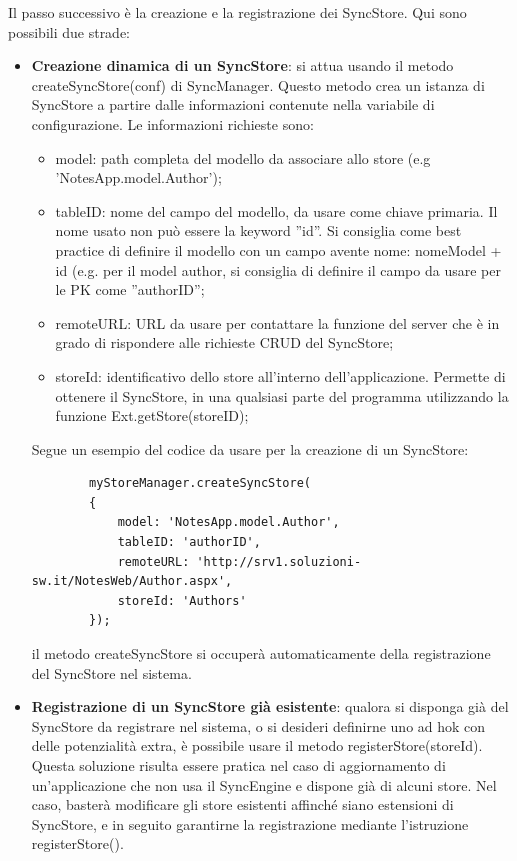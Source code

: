 \documentclass[10pt,a4paper,onecolumn]{article}
\begin{document}
Il passo successivo è la creazione e la registrazione dei SyncStore. Qui sono possibili due strade:
\begin{itemize}
	\item \textbf{Creazione dinamica di un SyncStore}: si attua usando il metodo createSyncStore(conf) di SyncManager. Questo metodo crea un istanza di SyncStore a partire dalle informazioni contenute nella variabile di configurazione. Le informazioni richieste sono:
		\begin{itemize}
			\item model: path completa del modello da associare allo store (e.g 'NotesApp.model.Author');
			\item tableID: nome del campo del modello, da usare come chiave primaria. Il nome usato non può essere la keyword ''id''. Si consiglia come best practice di definire il modello con un campo avente nome: nomeModel + id (e.g. per il model author, si consiglia di definire il campo da usare per le PK come ''authorID'';
			\item remoteURL: URL da usare per contattare la funzione del server che è in grado di rispondere alle richieste CRUD del SyncStore;
			\item storeId: identificativo dello store all'interno dell'applicazione. Permette di ottenere il SyncStore, in una qualsiasi parte del programma utilizzando la funzione Ext.getStore(storeID);
		\end{itemize}

		Segue un esempio del codice da usare per la creazione di un SyncStore:
		
		\begin{lstlisting}
		myStoreManager.createSyncStore(
		{
			model: 'NotesApp.model.Author',
			tableID: 'authorID',
			remoteURL: 'http://srv1.soluzioni-sw.it/NotesWeb/Author.aspx',
			storeId: 'Authors'
		});
		\end{lstlisting}

		il metodo createSyncStore si occuperà automaticamente della registrazione del SyncStore nel sistema.
		
	\item \textbf{Registrazione di un SyncStore già esistente}: qualora si disponga già del SyncStore da registrare nel sistema, o si desideri definirne uno ad hok con delle potenzialità extra, è possibile usare il metodo registerStore(storeId). Questa soluzione risulta essere pratica nel caso di aggiornamento di un'applicazione che non usa il SyncEngine e dispone già di alcuni store. Nel caso, basterà modificare gli store esistenti affinché siano estensioni di SyncStore, e in seguito garantirne la registrazione mediante l'istruzione registerStore().
\end{itemize}
\end{document}

